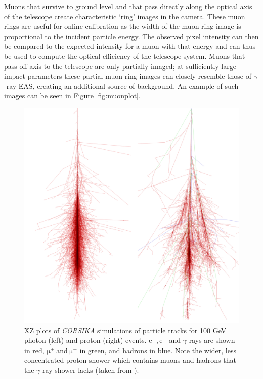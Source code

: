 Muons that survive to ground level and that pass directly along the optical axis of the telescope create characteristic `ring' images in the camera. These muon rings are useful for online calibration as the width of the muon ring image is proportional to the incident particle energy. The observed pixel intensity can then be compared to the expected intensity for a muon with that energy and can thus be used to compute the optical efficiency of the telescope system. Muons that pass off-axis to the telescope are only partially imaged; at sufficiently large impact parameters these partial muon ring images can closely resemble those of $\gamma$-ray EAS, creating an additional source of background. An example of such images can be seen in Figure \ref{fig:muonplot}.

\begin{figure}
\begin{center}  

\includegraphics[width=\columnwidth]{figures/showers.png}
 
\caption{XZ plots of \textit{CORSIKA} simulations of particle tracks for 100 GeV photon (left) and proton (right) events. $\mathrm{e^+,e^-}$ and $\gamma$-rays are shown in red, $\mathrm{\mu^+\ and\ \mu^-}$ in green, and hadrons in blue. Note the wider, less concentrated proton shower which contains muons and hadrons that the $\gamma$-ray shower lacks (taken from \cite{corskplot}).}
\label{fig:image2}
\end{center}
\end{figure}
